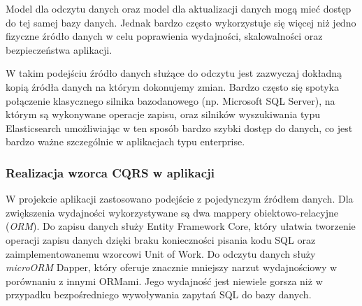 Model dla odczytu danych oraz model dla aktualizacji danych mogą mieć dostęp do tej samej bazy danych. Jednak bardzo często wykorzystuje się więcej niż jedno fizyczne źródło danych w celu poprawienia wydajności, skalowalności oraz bezpieczeństwa aplikacji.

W takim podejściu źródło danych służące do odczytu jest  zazwyczaj dokładną kopią źródła danych na którym dokonujemy zmian. Bardzo często się spotyka połączenie klasycznego silnika bazodanowego (np. Microsoft SQL Server), na którym są wykonywane operacje zapisu, oraz silników wyszukiwania typu Elasticsearch umożliwiając w ten sposób bardzo szybki dostęp do danych, co jest bardzo ważne szczególnie w aplikacjach typu enterprise.

\subsubsection*{Realizacja wzorca CQRS w aplikacji}

W projekcie aplikacji zastosowano podejście z pojedynczym źródłem danych. Dla zwiększenia wydajności wykorzystywane są dwa mappery obiektowo-relacyjne (\textit{ORM}). Do zapisu danych służy Entity Framework Core, który ułatwia tworzenie operacji zapisu danych dzięki braku konieczności pisania kodu SQL oraz zaimplementowanemu wzorcowi Unit of Work. Do odczytu danych służy \textit{microORM} Dapper, który oferuje znacznie mniejszy narzut wydajnościowy w porównaniu z innymi ORMami. Jego wydajność jest niewiele gorsza niż w przypadku bezpośredniego wywoływania zapytań SQL do bazy danych.

